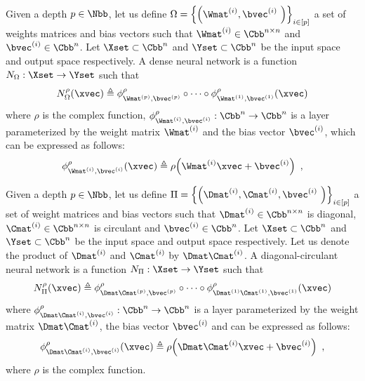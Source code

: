 \begin{definition}
  Given a depth $\depth \in \Nbb$,
  let us define $\Omega = \left\{ \left( \Wmat^{(i)}, \bvec^{(i)} \right) \right\}_{i \in [\depth]}$ a set of weights matrices and bias vectors 
  such that $\Wmat^{(i)} \in \Cbb^{n \times n}$ and $\bvec^{(i)} \in \Cbb^n$. 
  Let $\Xset \subset \Cbb^n$ and $\Yset \subset \Cbb^n$ be the input space and output space respectively. 
  A dense neural network is a function $\nn_\Omega: \Xset \rightarrow \Yset$ such that
  \begin{equation}
    \nn^\act_\Omega (\xvec) \triangleq \layer^\act_{\Wmat^{(\depth)}, \bvec^{(\depth)}} \circ \cdots \circ \layer^\act_{\Wmat^{(1)}, \bvec^{(1)}}(\xvec)
  \end{equation}
  where $\rho$ is the complex \relu function, $\layer^{\act}_{\Wmat^{(i)},\bvec^{(i)}}: \Cbb^n \rightarrow \Cbb^n$ is a layer parameterized by the weight matrix $\Wmat^{(i)}$ and the bias vector $\bvec^{(i)}$, which can be expressed as follows: 
  \begin{equation}
    \layer^{\act}_{\Wmat^{(i)},\bvec^{(i)}} (\xvec) \triangleq \act \left(\Wmat^{(i)}\xvec + \bvec^{(i)}\right) \enspace,
  \end{equation}
  \removespace
\end{definition}


\begin{definition}
  Given a depth $\depth \in \Nbb$,
  let us define $\Pi = \left\{ \left( \Dmat^{(i)}, \Cmat^{(i)}, \bvec^{(i)} \right) \right\}_{i \in [\depth]}$ a set of weight matrices and bias vectors 
  such that $\Dmat^{(i)} \in \Cbb^{n \times n}$ is diagonal, $\Cmat^{(i)} \in \Cbb^{n \times n}$ is circulant and $\bvec^{(i)} \in \Cbb^n$. 
  Let $\Xset \subset \Cbb^n$ and $\Yset \subset \Cbb^n$ be the input space and output space respectively. 
  Let us denote the product of $\Dmat^{(i)}$ and $\Cmat^{(i)}$ by $\Dmat\Cmat^{(i)}$.
  A diagonal-circulant neural network is a function $\nn_\Pi: \Xset \rightarrow \Yset$ such that
  \begin{equation}
    \nn^\act_\Pi (\xvec) \triangleq \layer^\act_{\Dmat\Cmat^{(\depth)}, \bvec^{(\depth)}} \circ \cdots \circ \layer^\act_{\Dmat^{(1)}\Cmat^{(1)}, \bvec^{(1)}}(\xvec)
  \end{equation}
  where $\layer^{\act}_{\Dmat\Cmat^{(i)},\bvec^{(i)}}: \Cbb^n \rightarrow \Cbb^n$ is a layer parameterized by the weight matrix $\Dmat\Cmat^{(i)}$, the bias vector $\bvec^{(i)}$ and can be expressed as follows: 
  \begin{equation}
    \layer^{\act}_{\Dmat\Cmat^{(i)},\bvec^{(i)}} (\xvec) \triangleq \act \left(\Dmat\Cmat^{(i)}\xvec + \bvec^{(i)}\right) \enspace,
  \end{equation}
  where $\rho$ is the complex \relu function.
\end{definition}


